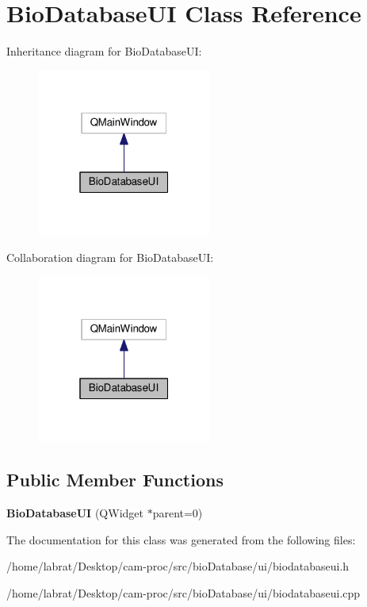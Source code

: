 \hypertarget{classBioDatabaseUI}{}\section{Bio\+Database\+UI Class Reference}
\label{classBioDatabaseUI}


Inheritance diagram for Bio\+Database\+UI\+:\nopagebreak
\begin{figure}[H]
\begin{center}
\leavevmode
\includegraphics[width=163pt]{classBioDatabaseUI__inherit__graph}
\end{center}
\end{figure}


Collaboration diagram for Bio\+Database\+UI\+:\nopagebreak
\begin{figure}[H]
\begin{center}
\leavevmode
\includegraphics[width=163pt]{classBioDatabaseUI__coll__graph}
\end{center}
\end{figure}
\subsection*{Public Member Functions}
\begin{DoxyCompactItemize}
\item 
{\bfseries Bio\+Database\+UI} (Q\+Widget $\ast$parent=0)\hypertarget{classBioDatabaseUI_aec4e8a22e05dc5467acbec786ed384e5}{}\label{classBioDatabaseUI_aec4e8a22e05dc5467acbec786ed384e5}

\end{DoxyCompactItemize}


The documentation for this class was generated from the following files\+:\begin{DoxyCompactItemize}
\item 
/home/labrat/\+Desktop/cam-\/proc/src/bio\+Database/ui/biodatabaseui.\+h\item 
/home/labrat/\+Desktop/cam-\/proc/src/bio\+Database/ui/biodatabaseui.\+cpp\end{DoxyCompactItemize}
